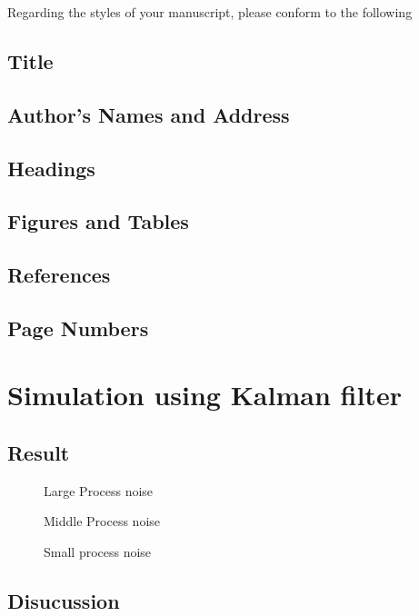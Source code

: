 \documentclass[a4paper]{article}
\begin{document}
Regarding the styles of your manuscript, please conform to the following 

\subsection{Title}
\subsection{Author's Names and Address}
\subsection{Headings}
\subsection{Figures and Tables} 


\subsection{References}


\subsection{Page Numbers}



\section{Simulation using Kalman filter}
%
%
%
%
%
%

\subsection{Result}
\begin{figure}
\centerline{}
\caption{Large Process noise}
\centerline{}
\caption{Middle Process noise}
\centerline{}
\caption{Small process noise}
\end{figure}
\subsection{Disucussion}
\end{document}
